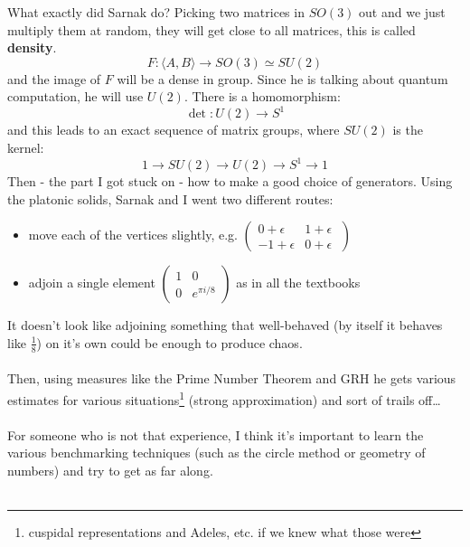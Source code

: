 \documentclass[12pt]{article}
\begin{document}
\newpage

\noindent What exactly did Sarnak do?  Picking two matrices in $SO(3)$ out and we just multiply them at random, they will get close to all matrices, this is called \textbf{density}. 
$$ F: \langle A, B \rangle \to SO(3) \simeq SU(2) $$ 
and the image of $F$ will be a dense in group.  Since he is talking about quantum computation, he will use $U(2)$.  There is a homomorphism:
$$ \det: U(2) \to S^1 $$
and this leads to an exact sequence of matrix groups, where $SU(2)$ is the kernel:
$$ 1 \to SU(2) \to U(2) \to S^1 \to 1 $$
Then - the part I got stuck on - how to make a good choice of generators.  Using the platonic solids, Sarnak and I went two different routes:
\begin{itemize}
\item  move each of the vertices slightly, e.g. $\left( \begin{array}{rl}0  + \epsilon & 1 +\epsilon \; \\ -1 + \epsilon & 0 +  \epsilon  \end{array} \right) $ 
\item adjoin a single element $\left( \begin{array}{cc} 1 & 0 \\ 0 & e^{\pi i / 8} \end{array} \right) $ as in all the textbooks
\end{itemize}
It doesn't look like adjoining something that well-behaved (by itself it behaves like $\frac{1}{8}$) on it's own could be enough to produce chaos.  \\ \\ Then, using measures like the Prime Number Theorem and GRH he gets various estimates for various situations\footnote{cuspidal representations and Adeles, etc. if we knew what those were} (strong approximation) and sort of trails off\dots \\ \\
For someone who is not that experience, I think it's important to learn the various benchmarking techniques (such as the circle method or geometry of numbers) and try to get as far along. \\ \\


\vfill 


\selectfont \fontsize{12}{10}\selectfont
\end{document}
